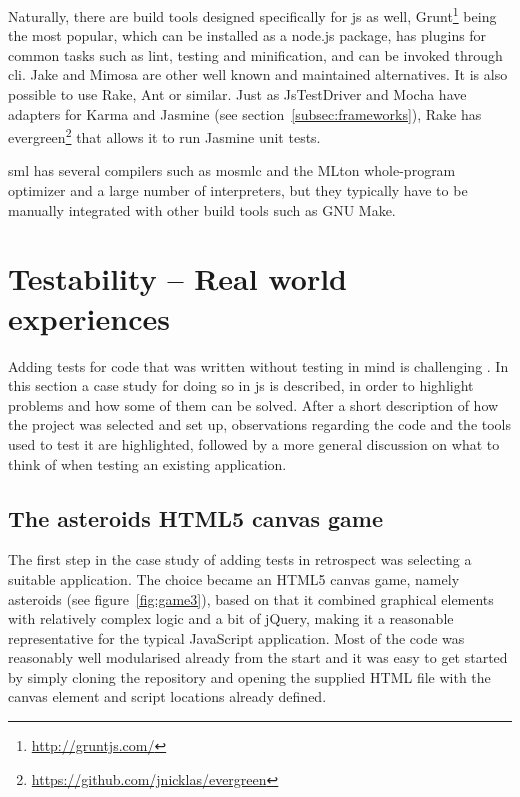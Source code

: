 \documentclass[11pt]{article}
\begin{document}
Naturally, there are build tools designed specifically for \gls{js} as well, Grunt\footnote{\url{http://gruntjs.com/}} being the most popular, which can be installed as a node.js package, has plugins for common tasks such as lint, testing and minification, and can be invoked through \gls{cli}. \cite[question~52]{Edelstam} Jake and Mimosa are other well known and maintained alternatives. It is also possible to use Rake, Ant or similar. Just as JsTestDriver and Mocha have adapters for Karma and Jasmine (see section~\ref{subsec:frameworks}), Rake has evergreen\footnote{\url{https://github.com/jnicklas/evergreen}} that allows it to run Jasmine unit tests. \cite{BuildTools}\cite[question~6]{Ahnve}

\Gls{sml} has several compilers such as mosmlc and the MLton whole-program optimizer and a large number of interpreters, but they typically have to be manually integrated with other build tools such as GNU Make.


\section{Testability -- Real world experiences}
\label{sec:testability}

Adding tests for code that was written without testing in mind is challenging \cite[p.~18]{Tddjs}. In this section a case study for doing so in \gls{js} is described, in order to highlight problems and how some of them can be solved. After a short description of how the project was selected and set up, observations regarding the code and the tools used to test it are highlighted, followed by a more general discussion on what to think of when testing an existing application.

\subsection{The asteroids HTML5 canvas game}
\label{subsec:asteriods}

The first step in the case study of adding tests in retrospect was selecting a suitable application. The choice became an HTML5 canvas game, namely asteroids (see figure~\ref{fig:game3}), based on that it combined graphical elements with relatively complex logic and a bit of jQuery, making it a reasonable representative for the typical JavaScript application. Most of the code was reasonably well modularised already from the start and it was easy to get started by simply cloning the repository and opening the supplied HTML file with the canvas element and script locations already defined.
\end{document}
